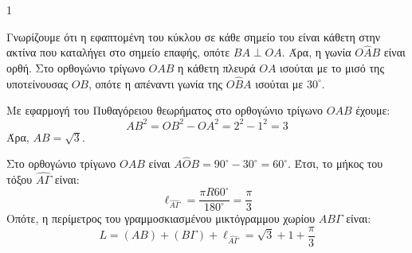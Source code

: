 \begin{ylh}{1}
    \item [ΛΥΣΗ]
\end{ylh}
\begin{figure}
\centering
{}
\end{figure}
\begin{alist}
    \item Γνωρίζουμε ότι η εφαπτομένη του κύκλου σε κάθε σημείο του είναι κάθετη στην ακτίνα που καταλήγει στο σημείο επαφής, οπότε $ΒΑ \perp ΟΑ$. Άρα, η γωνία $O\hat{A}B$ είναι ορθή.
    Στο ορθογώνιο τρίγωνο $OAB$ η κάθετη πλευρά $OA$ ισούται με το μισό της υποτείνουσας $OB$, οπότε η απέναντι γωνία της $O\hat{B}A$ ισούται με $30^\circ$.
    \item Με εφαρμογή του Πυθαγόρειου θεωρήματος στο ορθογώνιο τρίγωνο $OAB$ έχουμε:
    \[ AB^2 = OB^2 - OA^2 = 2^2 - 1^2 = 3 \]
    Άρα, $AB = \sqrt{3}$.
    \item Στο ορθογώνιο τρίγωνο $OAB$ είναι $A\hat{O}B = 90^\circ - 30^\circ = 60^\circ$. Έτσι, το μήκος του τόξου $\widehat{A\Gamma}$ είναι:
    \[ \ell_{\widehat{A\Gamma}} = \frac{\pi R 60^\circ}{180^\circ} = \frac{\pi}{3} \]
    Οπότε, η περίμετρος του γραμμοσκιασμένου μικτόγραμμου χωρίου $ΑΒΓ$ είναι:
    \[ L = (AB) + (ΒΓ) + \ell_{\widehat{A\Gamma}} = \sqrt{3}+1+\frac{\pi}{3} \]
\end{alist}